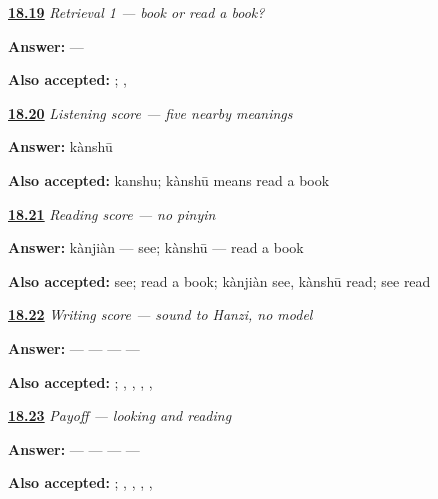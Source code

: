 \noindent\begin{minipage}[t]{\linewidth}
\raggedright
\hyperlink{review-ZH-R18-book-reading-r1-order}{\textbf{18.19}} \emph{Retrieval 1 — book or read a book?}\par
\small \textbf{Answer:}  — \par
\footnotesize \textbf{Also accepted:}  ; , 
\end{minipage}\par\medskip

\noindent\begin{minipage}[t]{\linewidth}
\raggedright
\hyperlink{review-ZH-R18-listening-five-contrast}{\textbf{18.20}} \emph{Listening score — five nearby meanings}\par
\small \textbf{Answer:} kànshū\par
\footnotesize \textbf{Also accepted:} kanshu; kànshū means read a book
\end{minipage}\par\medskip

\noindent\begin{minipage}[t]{\linewidth}
\raggedright
\hyperlink{review-ZH-R18-reading-five-endings}{\textbf{18.21}} \emph{Reading score — no pinyin}\par
\small \textbf{Answer:} kànjiàn — see; kànshū — read a book\par
\footnotesize \textbf{Also accepted:} see; read a book; kànjiàn see, kànshū read;  see  read
\end{minipage}\par\medskip

\noindent\begin{minipage}[t]{\linewidth}
\raggedright
\hyperlink{review-ZH-R18-writing-five-order}{\textbf{18.22}} \emph{Writing score — sound to Hanzi, no model}\par
\small \textbf{Answer:}  —  —  —  — \par
\footnotesize \textbf{Also accepted:}     ; , , , , 
\end{minipage}\par\medskip

\noindent\begin{minipage}[t]{\linewidth}
\raggedright
\hyperlink{review-ZH-C18-practice-pass}{\textbf{18.23}} \emph{Payoff — looking and reading}\par
\small \textbf{Answer:}  —  —  —  — \par
\footnotesize \textbf{Also accepted:}     ; , , , , 
\end{minipage}\par\medskip

